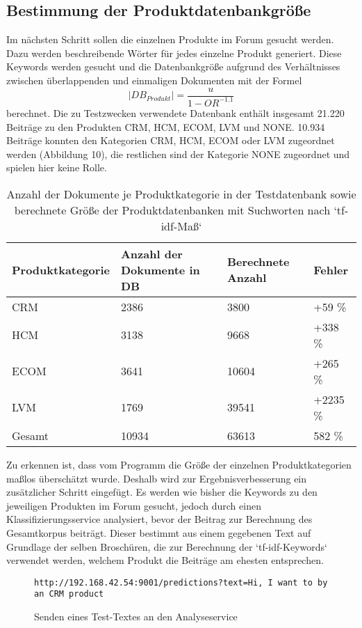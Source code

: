 \subsection{Bestimmung der Produktdatenbankgröße}

Im nächsten Schritt sollen die einzelnen Produkte im Forum gesucht werden. Dazu werden beschreibende Wörter für jedes einzelne Produkt generiert. Diese Keywords werden gesucht und die Datenbankgröße aufgrund des Verhältnisses zwischen überlappenden und einmaligen Dokumenten mit der Formel  \[|DB_{Produkt}| = \frac{u}{1-OR^{-1.1}}\] \cite{lu2008efficient} berechnet. Die zu Testzwecken verwendete Datenbank enthält insgesamt 21.220 Beiträge zu den Produkten CRM, HCM, ECOM, LVM und NONE. 10.934 Beiträge konnten den Kategorien CRM, HCM, ECOM oder LVM zugeordnet werden (Abbildung 10), die restlichen sind der Kategorie NONE zugeordnet und spielen hier keine Rolle.

\begin{table}[h!]
\centering 
\begin{tabular}{ | p{3cm} | l  | l | l |}
\hline
\textbf{Produktkategorie} & \textbf{Anzahl der Dokumente in DB} & \textbf{Berechnete Anzahl} & \textbf{Fehler}\\ \hline
CRM & 2386 & 3800 & +59 \%\\ \hline
HCM & 3138 & 9668 & +338 \%\\ \hline
ECOM & 3641 & 10604 & +265 \%\\ \hline
LVM & 1769 & 39541 & +2235 \%\\ \hline
Gesamt & 10934 & 63613 & 582 \% \\ \hline
\end{tabular}
\caption{Anzahl der Dokumente je Produktkategorie in der Testdatenbank sowie berechnete Größe der Produktdatenbanken mit Suchworten nach `tf-idf-Maß`}
\end{table}

Zu erkennen ist, dass vom Programm die Größe der einzelnen Produktkategorien maßlos überschätzt wurde. Deshalb wird zur Ergebnisverbesserung ein zusätzlicher Schritt eingefügt. Es werden wie bisher die Keywords zu den jeweiligen Produkten im Forum gesucht, jedoch durch einen Klassifizierungsservice \cite{n2o} analysiert, bevor der Beitrag zur Berechnung des Gesamtkorpus beiträgt. Dieser bestimmt aus einem gegebenen Text auf Grundlage der selben Broschüren, die zur Berechnung der `tf-idf-Keywords` verwendet werden, welchem Produkt die Beiträge am ehesten entsprechen.

\begin{figure}[h!]
\begin{lstlisting}[language=HTML5]
http://192.168.42.54:9001/predictions?text=Hi, I want to by an CRM product
\end{lstlisting}
\caption{Senden eines Test-Textes an den Analyseservice}
\end{figure}

